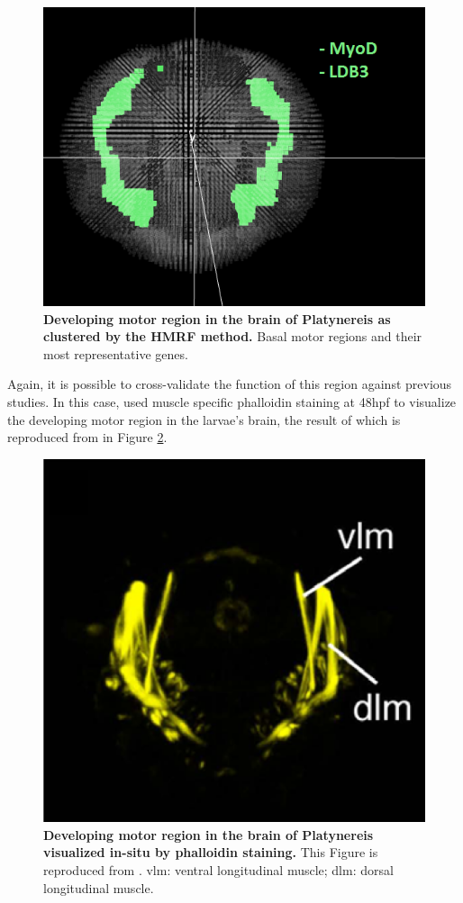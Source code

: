 	\begin{figure}[h]
\centerline{\includegraphics[width=0.8\linewidth]{gfx/chapter6/muscles.png}}
\caption{{\bf Developing motor region in the brain of Platynereis as clustered by the HMRF method.} Basal motor regions and their most representative genes.}
\label{fig:muscles}
	\end{figure}
		
		Again, it is possible to cross-validate the function of this region against previous studies. In this case, \citep{Fischer10} used muscle specific phalloidin staining at 48hpf to visualize the developing motor region in the larvae's brain, the result of which is reproduced from \citep{Fischer10} in Figure \ref{fig:muscles_stain}. 
		
		
	\begin{figure}[H]
\centerline{\includegraphics[width=0.6\linewidth]{gfx/chapter6/muscle_stain.png}}
\caption{{\bf Developing motor region in the brain of Platynereis visualized in-situ by phalloidin staining.} This Figure is reproduced from \citep{Fischer10}. vlm: ventral longitudinal muscle; dlm: dorsal longitudinal muscle.}
\label{fig:muscles_stain}
	\end{figure}
	
